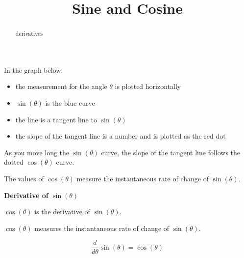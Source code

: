 \documentclass{ximera}
\title{Sine and Cosine}
\begin{document}
\begin{abstract}
derivatives
\end{abstract}
\maketitle








In the graph below, 

\begin{itemize}
\item the measurement for the angle $\theta$ is plotted horizontally
\item $\sin(\theta)$ is the blue curve
\item the line is a tangent line to $\sin(\theta)$
\item the slope of the tangent line is a number and is plotted as the red dot
\end{itemize}

As you move long the $\sin(\theta)$ curve, the slope of the tangent line follows the dotted $\cos(\theta)$ curve.



\begin{center}
\end{center}



The values of $\cos(\theta)$ measure the instantaneous rate of change of $\sin(\theta)$.



\begin{theorem}  \textbf{\textcolor{green!50!black}{Derivative of $\sin(\theta)$}}

\begin{center}
$\cos(\theta)$ is the derivative of $\sin(\theta)$.  

$\cos(\theta)$ measures the instantaneous rate of change of $\sin(\theta)$.  
\end{center}


\[
\frac{d}{d\theta} \sin(\theta) = \cos(\theta)
\]

\end{theorem}
\end{document}
